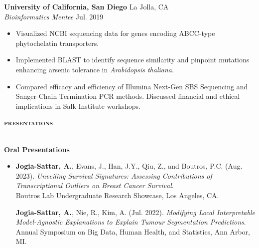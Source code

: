 \documentclass[a4paper]{article}
\newcommand{\lineunder} {
    \vspace*{-8pt} \\
    \hspace*{-18pt} \hrulefill \\
}
\newcommand{\header} [1] {
    {\hspace*{-18pt}\vspace*{6pt} \large{\textbf{\textsc{\MakeLowercase{#1}}}}}
    \vspace*{-6pt}\lineunder
}
\begin{document}
\textbf{University of California, San Diego} \hfill La Jolla, CA\\
\textit{Bioinformatics Mentee} \hfill Jul. 2019\\
\vspace{1mm}
\setlength\leftskip{25pt}

\setlength\leftskip{0pt}
\vspace{-1mm}
\begin{itemize}
	\setlength\itemsep{0pt}  %
	\setlength\parskip{0pt}  %
	\setlength\parsep{0pt}  %
	\setlength\leftskip{0pt}  %
	\renewcommand\labelitemi{\tiny$\bullet$} %
    \item Visualized NCBI sequencing data for genes encoding ABCC-type phytochelatin transporters.
    \item Implemented BLAST to identify sequence similarity and pinpoint mutations enhancing arsenic tolerance in \textit{Arabidopsis thaliana}.
    \item Compared efficacy and efficiency of Illumina Next-Gen SBS Sequencing and Sanger-Chain Termination PCR methods. Discussed
financial and ethical implications in Salk Institute workshops.
\end{itemize}
\vspace{2mm}
\header{Presentations}
\vspace{2mm}

\textbf{Oral Presentations}
\begin{itemize}
\item[] 
    \textbf{Jogia-Sattar, A.}, Evans, J., Han, J.Y., Qiu, Z., and Boutros, P.C. (Aug. 2023). \textit{Unveiling Survival Signatures: Assessing Contributions of Transcriptional Outliers on Breast Cancer Survival}. \\
    Boutros Lab Undergraduate Research Showcase, Los Angeles, CA.
    
    \vspace{2mm}
    
    \textbf{Jogia-Sattar, A.}, Nie, R., Kim, A. (Jul. 2022). \textit{Modifying Local Interpretable Model-Agnostic Explanations to Explain Tumour Segmentation Predictions}. \\
    Annual Symposium on Big Data, Human Health, and Statistics, Ann Arbor, MI.
\end{itemize}
\end{document}
